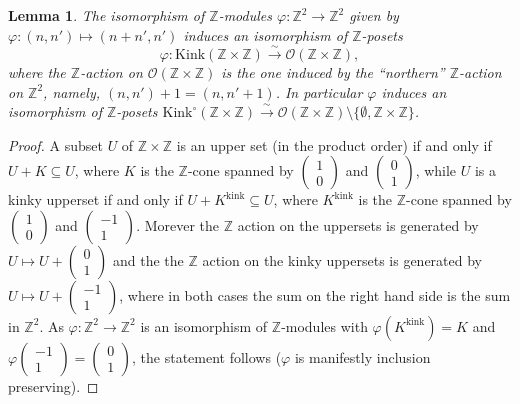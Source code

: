 \documentclass{article}
\newtheorem{lem}[thm]{Lemma}
\theoremstyle{definition}
\newcommand{\Z}{\mathbb{Z}}
\newcommand{\Oo}{\mathcal{O}}
\begin{document}
\begin{lem}\label{equiv}
The isomorphism of $\Z$-modules $\varphi\colon \Z^2\to \Z^2$ given by $\varphi\colon (n,n')\mapsto (n+n',n')$ induces an isomorphism of $\Z$-posets 
\[
\varphi\colon \mathrm{Kink}(\Z\times \Z)\xrightarrow{\sim} \Oo(\Z\times \Z),
\]
where the $\Z$-action on $\Oo(\Z\times \Z)$ is the one induced by the ``northern'' $\Z$-action on $\Z^2$, namely, $(n,n')+1=(n,n'+1)$. In particular $\varphi$ induces an isomorphism of $\Z$-posets $\mathrm{Kink}^{\circ}(\Z\times \Z)\xrightarrow{\sim} \Oo(\Z\times \Z)\setminus\{\emptyset,\Z\times\Z\}$.
\end{lem}
\begin{proof}
A subset $U$ of $\Z\times \Z$ is an upper set (in the product order) if and only if $U+K\subseteq U$, where $K$ is the $\Z$-cone spanned by $\left(\begin{smallmatrix}1\\0\end{smallmatrix}\right)$ and $\left(\begin{smallmatrix}0\\1\end{smallmatrix}\right)$, while $U$ is a kinky upperset if and only if $U+K^\mathrm{kink}\subseteq U$, where $K^\mathrm{kink}$ is the $\Z$-cone spanned by $\left(\begin{smallmatrix}1\\0\end{smallmatrix}\right)$ and $\left(\begin{smallmatrix}-1\\1\end{smallmatrix}\right)$. Morever the $\Z$ action on the uppersets is generated by $U\mapsto U+\left(\begin{smallmatrix}0\\1\end{smallmatrix}\right)$ and the the $\Z$ action on the kinky uppersets is generated by $U\mapsto U+\left(\begin{smallmatrix}-1\\1\end{smallmatrix}\right)$, where in both cases the sum on the right hand side is the sum in $\Z^2$. As $\varphi \colon \Z^2\to \Z^2$ is an isomorphism of $\Z$-modules with $\varphi(K^\mathrm{kink})=K$ and $\varphi\left(\begin{smallmatrix}-1\\1\end{smallmatrix}\right)=\left(\begin{smallmatrix}0\\1\end{smallmatrix}\right)$, the statement follows ($\varphi$ is manifestly inclusion preserving).
\end{proof}
\end{document}
